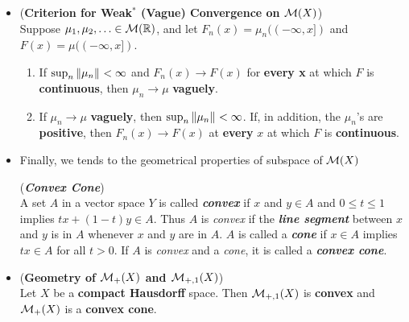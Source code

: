\documentclass[11pt]{article}
\begin{document}
\begin{itemize}
\item \begin{proposition} (\textbf{Criterion for Weak$^{*}$ (Vague) Convergence on ${\mathcal M}(X)$}) \citep{folland2013real}\\
Suppose $\mu_1, \mu_2, \ldots \in {\mathcal M}({\mathbb R})$, and let $F_{n}(x) = \mu_n((-\infty, x])$ and $F(x) = \mu((-\infty, x])$.
\begin{enumerate}
\item  If $\sup_n\left\|\mu_n\right\|_{} < \infty$ and $F_n(x) \rightarrow F(x)$ for \textbf{every x} at which $F$ is \textbf{continuous},
then $\mu_n \rightarrow \mu$ \textbf{vaguely}.
\item If $\mu_n \rightarrow \mu$ \textbf{vaguely}, then $\sup_n\left\|\mu_n\right\|_{} < \infty$. If, in addition, the $\mu_n$’s are \textbf{positive},
then $F_n(x) \rightarrow F(x)$ at \textbf{every} $x$ at which $F$ is \textbf{continuous}.
\end{enumerate}
\end{proposition}

\item Finally, we tends to the geometrical properties of subspace of ${\mathcal M}(X)$
\begin{definition} (\emph{\textbf{Convex Cone}})\\
A set $A$ in a vector space $Y$ is called \emph{\textbf{convex}} if $x$ and $y \in A$  and $0 \le t \le 1$ implies $tx + (1 - t)y \in A$. Thus $A$ is \emph{convex} if the \emph{\textbf{line segment}}  between $x$ and $y$ is in $A$ whenever $x$ and $y$ are in $A$. $A$ is called a \emph{\textbf{cone}} if $x \in A$ implies $tx \in A$ for all $t > 0$. If $A$ is \emph{convex} and a \emph{cone}, it is called  a \emph{\textbf{convex cone}}. 
\end{definition}

\item \begin{proposition} (\textbf{Geometry of ${\mathcal M}_{+}(X)$ and ${\mathcal M}_{+,1}(X)$}) \citep{reed1980methods}\\
Let $X$ be a \textbf{compact Hausdorff} space. Then ${\mathcal M}_{+,1}(X)$ is \textbf{convex} and ${\mathcal M}_{+}(X)$ is a \textbf{convex cone}. 
\end{proposition}
\end{itemize}


\newpage


\end{document}
